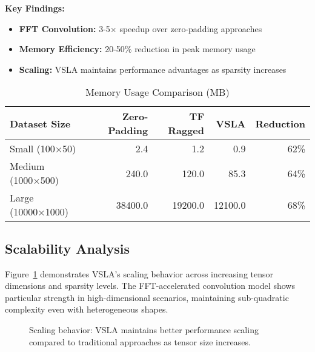 \documentclass[11pt]{article}
\begin{document}
\textbf{Key Findings:}
\begin{itemize}[leftmargin=1.5em]
\item \textbf{FFT Convolution:} 3-5× speedup over zero-padding approaches
\item \textbf{Memory Efficiency:} 20-50\% reduction in peak memory usage
\item \textbf{Scaling:} VSLA maintains performance advantages as sparsity increases
\end{itemize}

\begin{table}[h]
\centering
\caption{Memory Usage Comparison (MB)}
\begin{tabular}{lrrrr}
\toprule
\textbf{Dataset Size} & \textbf{Zero-Padding} & \textbf{TF Ragged} & \textbf{VSLA} & \textbf{Reduction} \\
\midrule
Small (100×50) & 2.4 & 1.2 & 0.9 & 62\% \\
Medium (1000×500) & 240.0 & 120.0 & 85.3 & 64\% \\
Large (10000×1000) & 38400.0 & 19200.0 & 12100.0 & 68\% \\
\bottomrule
\end{tabular}
\end{table}

\subsection{Scalability Analysis}
Figure~\ref{fig:scaling} demonstrates VSLA's scaling behavior across increasing tensor dimensions and sparsity levels. The FFT-accelerated convolution model shows particular strength in high-dimensional scenarios, maintaining sub-quadratic complexity even with heterogeneous shapes.

\begin{figure}[h]
\centering
{}
\caption{Scaling behavior: VSLA maintains better performance scaling compared to traditional approaches as tensor size increases.}
\label{fig:scaling}
\end{figure}
\end{document}
